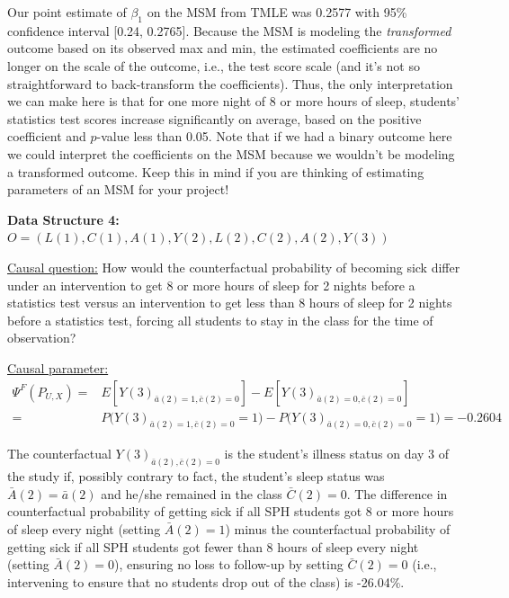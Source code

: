 \documentclass{exam}
\begin{document}
Our point estimate of $\beta_1$ on the MSM from TMLE was 0.2577 with 95\% confidence interval [0.24, 0.2765]. Because the MSM is modeling the \textit{transformed} outcome based on its observed max and min, the estimated coefficients are no longer on the scale of the outcome, i.e., the test score scale (and it's not so straightforward to back-transform the coefficients). Thus, the only interpretation we can make here is that for one more night of 8 or more hours of sleep, students' statistics test scores increase significantly on average, based on the positive coefficient and $p$-value less than 0.05. Note that if we had a binary outcome here we could interpret the coefficients on the MSM because we wouldn't be modeling a transformed outcome. Keep this in mind if you are thinking of estimating parameters of an MSM for your project!



\noindent\large\textbf{Data Structure 4: $O = (L(1), C(1), A(1), Y(2), L(2), C(2), A(2), Y(3))$}
\normalsize


\noindent\underline{Causal question:} How would the counterfactual probability of becoming sick differ under an intervention to get 8 or more hours of sleep for 2 nights before a statistics test versus an intervention to get less than 8 hours of sleep for 2 nights before a statistics test, forcing all students to stay in the class for the time of observation? 

\noindent\underline{Causal parameter:}
\begin{align*}
\Psi^F(P_{U,X}) = & E[Y(3)_{\bar{a}(2) = 1, \bar{c}(2) = 0}] - E[Y(3)_{\bar{a}(2) = 0, \bar{c}(2) = 0}] \\
= & P\big(Y(3)_{\bar{a}(2) = 1, \bar{c}(2) = 0} = 1\big) - P\big(Y(3)_{\bar{a}(2) = 0, \bar{c}(2) = 0} = 1\big) = -0.2604
\end{align*}

The counterfactual $Y(3)_{\bar{a}(2), \bar{c}(2)=0}$ is the student's illness status on day 3 of the study if, possibly contrary to fact, the student's sleep status was $\bar{A}(2)=\bar{a}(2)$ and he/she remained in the class $\bar{C}(2) = 0$. The difference in counterfactual probability of getting sick if all SPH students got 8 or more hours of sleep every night (setting $\bar{A}(2) = 1$) minus the counterfactual probability of getting sick if all SPH students got fewer than 8 hours of sleep every night (setting $\bar{A}(2) = 0$), ensuring no loss to follow-up by setting $\bar{C}(2) = 0$ (i.e., intervening to ensure that no students drop out of the class) is -26.04\%. 
\end{document}
